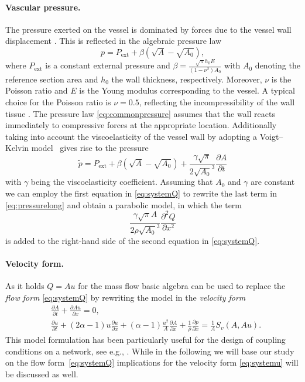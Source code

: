 \documentclass[a4paper,11pt]{article}
\begin{document}
\paragraph{Vascular pressure.} The pressure exerted on the vessel is dominated by forces due to the vessel wall displacement \cite{peiro2009reduc}. This is reflected in the algebraic pressure law
\begin{equation}\label{eq:commonpressure}
	p  = P_{\text{ext}} + \beta (\sqrt{A}- \sqrt{A_0}),
\end{equation}
where $P_{\text{ext}}$ is a constant external pressure and $\beta= \frac{\sqrt{\pi}h_0 E}{(1-\nu^2)A_0}$ with $A_0$ denoting the reference section area and $h_0$ the wall thickness, respectively. Moreover, $\nu$ is the Poisson ratio and $E$ is the Young modulus corresponding to the vessel. A typical choice for the Poisson ratio is $\nu=0.5$, reflecting the incompressibility of the wall tissue \cite{formaggia2003}.
The pressure law \eqref{eq:commonpressure} assumes that the wall reacts immediately to compressive forces at the appropriate location. Additionally taking into account the viscoelasticity of the vessel wall by adopting a Voigt–Kelvin model~\cite{fung1994biomec} gives rise to the pressure
\begin{equation}\label{eq:pressurelong}
	\tilde p= P_{\text{ext}}  + \beta (\sqrt{A}- \sqrt{A_0}) + \frac{\gamma \sqrt{\pi}}{2\sqrt{A_0}^3} \frac{\partial A}{\partial t} 
\end{equation}
with $\gamma$ being the viscoelasticity coefficient. Assuming that $A_0$ and $\gamma$ are constant we can employ the first equation in \eqref{eq:systemQ} to rewrite the last term in \eqref{eq:pressurelong} and obtain a parabolic model, in which the term
\begin{equation}\label{eq:parabolicterm}
  \frac{\gamma \sqrt{\pi} A}{2 \rho \sqrt{A_0}^3} \frac{\partial^2 Q}{\partial x^2} 
\end{equation}
is added to the right-hand side of the second equation in \eqref{eq:systemQ}.

\paragraph{Velocity form.} As it holds $Q= Au$ for the mass flow basic algebra can be used to replace the \emph{flow form} \eqref{eq:systemQ} by rewriting the model in the \emph{velocity form}
\begin{equation}\label{eq:systemu}
	\begin{split}
          &\frac{\partial A}{\partial t} + \frac{\partial Au}{\partial x} = 0, \\
          & \frac{\partial u}{\partial t} + (2\alpha-1) u \frac{\partial u}{\partial x} + (\alpha-1) \frac{u^2}{A} \frac{\partial A}{\partial x} + \frac{1}{\rho} \frac{\partial p}{\partial x}  = \frac{1}{A} S_v(A, Au).
	\end{split}
\end{equation}
This model formulation has been particularly useful for the design of coupling conditions on a network, see e.g., \cite{formaggia2003}. While in the following we will base our study on the flow form~\eqref{eq:systemQ} implications for the velocity form \eqref{eq:systemu} will be discussed as well.
\end{document}
